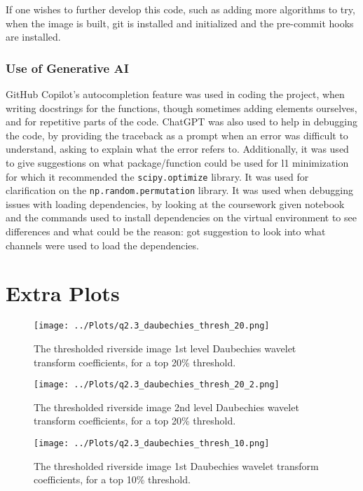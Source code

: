 \documentclass[12pt]{report} %
\begin{document}
If one wishes to further develop this code, such as adding more algorithms to try, when the image is built, git is installed and initialized and the pre-commit hooks are installed.

\subsubsection{Use of Generative AI}

GitHub Copilot's autocompletion feature was used in coding the project, when writing docstrings for the functions, though sometimes adding elements ourselves, and for repetitive parts of the code.
ChatGPT was also used to help in debugging the code, by providing the traceback as a prompt when an error was difficult to understand, asking to explain what the error refers to. Additionally, it was used to give suggestions on what package/function could be used for l1 minimization for which it recommended the \texttt{scipy.optimize} library. It was used for clarification on the \texttt{np.random.permutation} library. It was used when debugging issues with loading dependencies, by looking at the coursework given notebook and the commands used to install dependencies on the virtual environment to see differences and what could be the reason: got suggestion to look into what channels were used to load the dependencies.


\section{Extra Plots}

\begin{figure}[htbp]
    \centering
    \texttt{[image: ../Plots/q2.3\_daubechies\_thresh\_20.png]}
    \caption{The thresholded riverside image 1st level Daubechies wavelet transform coefficients, for a top 20\% threshold.}
    \label{fig:thresholded_image20}
\end{figure}

\begin{figure}[htbp]
    \centering
    \texttt{[image: ../Plots/q2.3\_daubechies\_thresh\_20\_2.png]}
    \caption{The thresholded riverside image 2nd level Daubechies wavelet transform coefficients, for a top 20\% threshold.}
    \label{fig:thresholded_image20_2}
\end{figure}

\begin{figure}[htbp]
    \centering
    \texttt{[image: ../Plots/q2.3\_daubechies\_thresh\_10.png]}
    \caption{The thresholded riverside image 1st Daubechies wavelet transform coefficients, for a top 10\% threshold.}
    \label{fig:thresholded_image10}
\end{figure}
\end{document}
